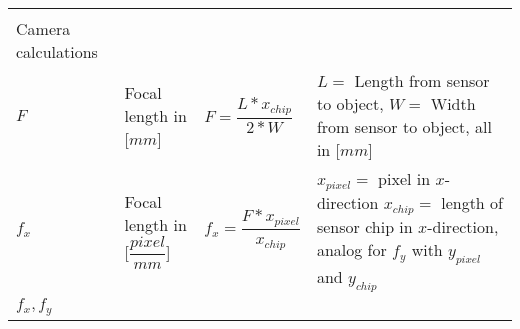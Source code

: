 \documentclass[
]{article}
\newcommand{\columnA}{0.06}
\newcommand{\columnB}{0.18}
\newcommand{\columnC}{0.33}
\newcommand{\columnD}{0.33}
\begin{document}
\begin{longtable}[]{@{}llll@{}}
\begin{minipage}[t]{\columnD\columnwidth}
\strut
\end{minipage}\hline\tabularnewline
\begin{minipage}[t]{\columnA\columnwidth}\raggedright
Camera calculations\strut
\end{minipage} & \begin{minipage}[t]{\columnB\columnwidth}\raggedright
\strut
\end{minipage} & \begin{minipage}[t]{\columnC\columnwidth}\raggedright
\strut
\end{minipage} & \begin{minipage}[t]{\columnD\columnwidth}\raggedright
\strut
\end{minipage}\hline\tabularnewline
\begin{minipage}[t]{\columnA\columnwidth}\raggedright
\(F\)\strut
\end{minipage} & \begin{minipage}[t]{\columnB\columnwidth}\raggedright
Focal length in {[}\(mm\){]}\strut
\end{minipage} & \begin{minipage}[t]{\columnC\columnwidth}\raggedright
\(F=\dfrac{L*x_{chip}}{2*W}\)\strut
\end{minipage} & \begin{minipage}[t]{\columnD\columnwidth}\raggedright
\(L=\) Length from sensor to object, \(W=\) Width from sensor to object,
all in {[}\(mm\){]}\strut
\end{minipage}\hline\tabularnewline
\begin{minipage}[t]{\columnA\columnwidth}\raggedright
\(f_x\)\strut
\end{minipage} & \begin{minipage}[t]{\columnB\columnwidth}\raggedright
Focal length in {[}\(\dfrac{pixel}{mm}\){]}\strut
\end{minipage} & \begin{minipage}[t]{\columnC\columnwidth}\raggedright
\(f_x = \dfrac{F*x_{pixel}}{x_{chip}}\)\strut
\end{minipage} & \begin{minipage}[t]{\columnD\columnwidth}\raggedright
\(x_{pixel}=\) pixel in \(x\)-direction \(x_{chip}=\) length of sensor
chip in \(x\)-direction, analog for \(f_y\) with \(y_{pixel}\) and
\(y_{chip}\)\strut
\end{minipage}\hline\tabularnewline
\begin{minipage}[t]{\columnA\columnwidth}\raggedright
\(f_x, f_y\)\strut
\end{minipage} & \begin{minipage}[t]{\columnB\columnwidth}\raggedright

\end{minipage}
\end{longtable}
\end{document}
